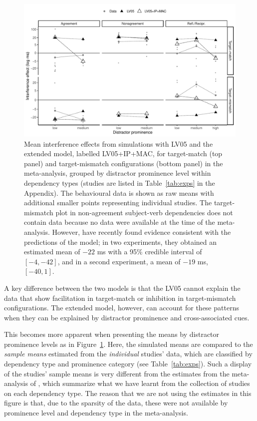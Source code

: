 \documentclass{cambridge7A}\usepackage[]{graphicx}\usepackage[]{color}
\begin{document}
\begin{figure}[!htbp]
\centering
\includegraphics[width=\textwidth]{figures/fig-simresults}

%
  \caption{Mean interference effects from simulations with LV05 and the extended model, labelled LV05+IP+MAC, for target-match (top panel) and target-mismatch configurations (bottom panel) in the \cite{JaegerEngelmannVasishth2017} meta-analysis, grouped by distractor prominence level within dependency types (studies are listed in Table~\ref{tab:exps} in the Appendix). The behavioural data is shown as raw means with additional smaller points representing individual studies. The target-mismatch plot in non-agreement subject-verb dependencies does not contain data because no data were available at the time of the meta-analysis. However, \cite{CunningsSturt2018} have recently found evidence consistent with the predictions of the model; in two experiments, they obtained an estimated mean of  $-22$ ms with a 95\% credible interval of $[-4,-42]$, and  in a second experiment, a mean of $-19$ ms, $[-40,1]$.
  }
  \label{fig:simresults} 
\end{figure}

A key difference between the two models is that the LV05 cannot explain the data that show facilitation in target-match or inhibition in target-mismatch configurations. The extended model, however, can account for these patterns when they can be explained by distractor prominence and cross-associated cues.

This becomes more apparent when presenting the means by distractor prominence levels as in Figure~\ref{fig:simresults}. Here, the simulated means are compared to the \textit{sample means} estimated from the \textit{individual} studies' data, which are classified by dependency type and prominence category (see Table~\ref{tab:exps}). Such a display of the studies' sample means is very different from the estimates from the meta-analysis of \cite{JaegerEngelmannVasishth2017}, which summarize what we have learnt from the collection of studies on each dependency type.
The reason that we are not using the estimates in this figure is that, due to the sparsity of the data, these were not available by prominence level and dependency type in the meta-analysis.
\end{document}
